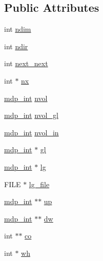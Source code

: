 \subsection*{Public Attributes}
\begin{DoxyCompactItemize}
\item 
int \hyperlink{classmdp__lattice_a215127d8822ab086ff06fdbc815fae91}{ndim}
\item 
int \hyperlink{classmdp__lattice_ace466601bc3fb9815648d775793985eb}{ndir}
\item 
int \hyperlink{classmdp__lattice_afc7199a6a019e3bfdb40f1367baf36e4}{next\+\_\+next}
\item 
int $\ast$ \hyperlink{classmdp__lattice_a2cdf4a8e76d5677dbcf7c0030daa3e37}{nx}
\item 
\hyperlink{mdp__global__vars_8h_aaa1ad9d0dcd2124aa5af0120d9954174}{mdp\+\_\+int} \hyperlink{classmdp__lattice_a602bacd9e2e1dd56819b118cf52672be}{nvol}
\item 
\hyperlink{mdp__global__vars_8h_aaa1ad9d0dcd2124aa5af0120d9954174}{mdp\+\_\+int} \hyperlink{classmdp__lattice_a98aee146f9cea665a75ca70b78ee85fa}{nvol\+\_\+gl}
\item 
\hyperlink{mdp__global__vars_8h_aaa1ad9d0dcd2124aa5af0120d9954174}{mdp\+\_\+int} \hyperlink{classmdp__lattice_ae8595ccbca06ce37aa14b56d27010b6b}{nvol\+\_\+in}
\item 
\hyperlink{mdp__global__vars_8h_aaa1ad9d0dcd2124aa5af0120d9954174}{mdp\+\_\+int} $\ast$ \hyperlink{classmdp__lattice_aac1057478186764ece27e33d1a215a7d}{gl}
\item 
\hyperlink{mdp__global__vars_8h_aaa1ad9d0dcd2124aa5af0120d9954174}{mdp\+\_\+int} $\ast$ \hyperlink{classmdp__lattice_a1f2238902be88b61a3cc677f912210ea}{lg}
\item 
F\+I\+LE $\ast$ \hyperlink{classmdp__lattice_a3c0a480cd7f6bf31cd8dbffd87e57ac3}{lg\+\_\+file}
\item 
\hyperlink{mdp__global__vars_8h_aaa1ad9d0dcd2124aa5af0120d9954174}{mdp\+\_\+int} $\ast$$\ast$ \hyperlink{classmdp__lattice_a14892e721f56e142037c511bf6543e8d}{up}
\item 
\hyperlink{mdp__global__vars_8h_aaa1ad9d0dcd2124aa5af0120d9954174}{mdp\+\_\+int} $\ast$$\ast$ \hyperlink{classmdp__lattice_a5fb45161a272c08b81eafca224546673}{dw}
\item 
int $\ast$$\ast$ \hyperlink{classmdp__lattice_ad4cffbef2302b39176943a783c8f4ecc}{co}
\item 
int $\ast$ \hyperlink{classmdp__lattice_adeee5743b0c437ec58026c98a0a3229f}{wh}
\item 
$$
\end{DoxyCompactItemize}
